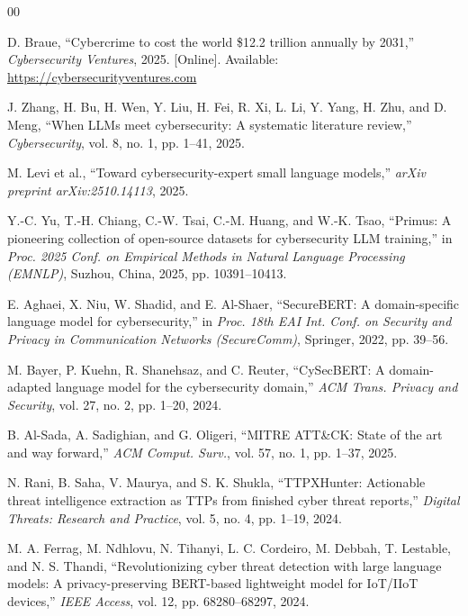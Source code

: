\documentclass[conference]{IEEEtran}
\begin{document}
\begin{thebibliography}{00}
\scriptsize
\setlength{\itemsep}{0pt}
\setlength{\parskip}{0pt}

D. Braue,
``Cybercrime to cost the world \$12.2 trillion annually by 2031,''
\textit{Cybersecurity Ventures}, 2025.
[Online]. Available: \url{https://cybersecurityventures.com}

J. Zhang, H. Bu, H. Wen, Y. Liu, H. Fei, R. Xi, L. Li, Y. Yang,
H. Zhu, and D. Meng,
``When LLMs meet cybersecurity: A systematic literature review,''
\textit{Cybersecurity}, vol. 8, no. 1, pp. 1--41, 2025.

M. Levi et al.,
``Toward cybersecurity-expert small language models,''
\textit{arXiv preprint arXiv:2510.14113}, 2025.

Y.-C. Yu, T.-H. Chiang, C.-W. Tsai, C.-M. Huang, and W.-K. Tsao,
``Primus: A pioneering collection of open-source datasets for
cybersecurity LLM training,''
in \textit{Proc. 2025 Conf. on Empirical Methods in Natural Language
Processing (EMNLP)},
Suzhou, China, 2025, pp. 10391--10413.

E. Aghaei, X. Niu, W. Shadid, and E. Al-Shaer,
``SecureBERT: A domain-specific language model for cybersecurity,''
in \textit{Proc. 18th EAI Int. Conf. on Security and Privacy in
Communication Networks (SecureComm)},
Springer, 2022, pp. 39--56.

M. Bayer, P. Kuehn, R. Shanehsaz, and C. Reuter,
``CySecBERT: A domain-adapted language model for the cybersecurity
domain,''
\textit{ACM Trans. Privacy and Security}, vol. 27, no. 2,
pp. 1--20, 2024.

B. Al-Sada, A. Sadighian, and G. Oligeri,
``MITRE ATT\&CK: State of the art and way forward,''
\textit{ACM Comput. Surv.}, vol. 57, no. 1, pp. 1--37, 2025.

N. Rani, B. Saha, V. Maurya, and S. K. Shukla,
``TTPXHunter: Actionable threat intelligence extraction as TTPs
from finished cyber threat reports,''
\textit{Digital Threats: Research and Practice}, vol. 5, no. 4,
pp. 1--19, 2024.

M. A. Ferrag, M. Ndhlovu, N. Tihanyi, L. C. Cordeiro, M. Debbah,
T. Lestable, and N. S. Thandi,
``Revolutionizing cyber threat detection with large language models:
A privacy-preserving BERT-based lightweight model for IoT/IIoT
devices,''
\textit{IEEE Access}, vol. 12, pp. 68280--68297, 2024.


\end{thebibliography}
\end{document}
